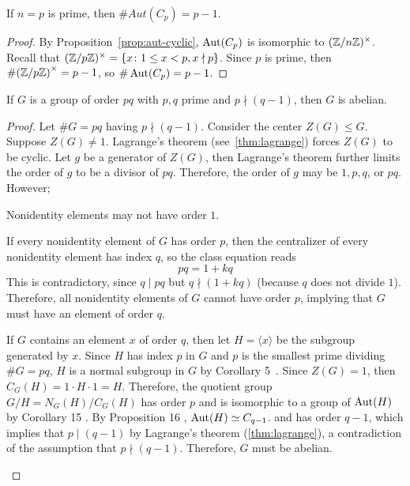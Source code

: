 \begin{proposition}
  If $n = p$ is prime, then $\#Aut(C_p) = p - 1$.

  \begin{proof}
    By Proposition~\ref{prop:aut-cyclic}, $\operatorname{Aut}(C_p)$ is isomorphic to $(\mathbb{Z}/n\mathbb{Z})^\times$.
    Recall that $(\mathbb{Z}/p\mathbb{Z})^\times = \{x \colon 1 \le x < p, x \nmid p \}$.
    Since $p$ is prime, then $\#{(\mathbb{Z}/p\mathbb{Z})}^\times = p - 1$,
    so $\#\operatorname{Aut}(C_p) = p - 1$.
  \end{proof}
\end{proposition}
\begin{proposition}
  If $G$ is a group of order $pq$ with $p, q$ prime and $p \nmid (q - 1)$,
  then $G$ is abelian.

  \begin{proof}
    Let $\#G = pq$ having $p \nmid (q-1)$.
    Consider the center $Z(G) \le G$. Suppose $Z(G) \ne 1$.
    Lagrange's theorem (see~\ref{thm:lagrange}) forces $Z(G)$ to be cyclic.
    Let $g$ be a generator of $Z(G)$,
    then Lagrange's theorem further limits the order of $g$ to be a divisor of $pq$.
    Therefore, the order of $g$ may be $1, p, q$, or $pq$. However;
    \begin{enumalph}
      \item Nonidentity elements may not have order $1$.
      \item If every nonidentity element of $G$ has order $p$,
        then the centralizer of every nonidentity
        element has index $q$, so the class equation reads \[pq = 1 + kq \]
        This is contradictory, since $q \mid pq$ but $q \nmid (1 + kq)$
        (because $q$ does not divide $1$).
        Therefore, all nonidentity elements of $G$ cannot have order $p$,
        implying that $G$ must have an element of order $q$.~\label{cor:order-p-then-q}        
      \item If $G$ contains an element $x$ of order $q$, then
        let $H = \langle x \rangle$ be the subgroup generated by $x$.
        Since $H$ has index $p$ in $G$ and $p$ is the smallest prime dividing $\#G = pq$,
        $H$ is a normal subgroup in $G$ by Corollary 5~\cite[p. 120]{DummitFoote}.
        Since $Z(G) = 1$, then $C_G(H) = 1 \cdot H \cdot 1 = H$. Therefore, the
        quotient group $G/H = N_G(H)/C_G(H)$ has order $p$ and is isomorphic to a group of
        $\operatorname{Aut}(H)$ by Corollary 15 \cite[p. 134]{DummitFoote}.
        By Proposition 16 \cite[p. 135]{DummitFoote}, $\operatorname{Aut}(H) \simeq C_{q-1}$.
        and has order $q-1$, which implies that $p \mid (q-1)$ by Lagrange's theorem (\ref{thm:lagrange}),
        a contradiction of the assumption that $p \nmid (q-1)$. Therefore, $G$ must be abelian.
    \end{enumalph}
  \end{proof}
\end{proposition}

